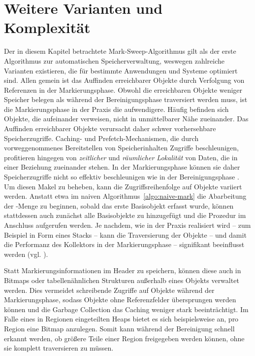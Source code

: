 

\section{Weitere Varianten und Komplexität}
\label{sec:mark-sweep-variations}
Der in diesem Kapitel betrachtete Mark-Sweep-Algorithmus gilt als der erste Algorithmus zur automatischen Speicherverwaltung, weswegen zahlreiche Varianten existieren, die für bestimmte Anwendungen und Systeme optimiert sind.
Allen gemein ist das Auffinden erreichbarer Objekte durch Verfolgung von Referenzen in der Markierungsphase.
Obwohl die erreichbaren Objekte weniger Speicher belegen als während der Bereinigungsphase traversiert werden muss, ist die Markierungsphase in der Praxis die aufwendigere.
Häufig befinden sich Objekte, die aufeinander verweisen, nicht in unmittelbarer Nähe zueinander.
Das Auffinden erreichbarer Objekte verursacht daher schwer vorhersehbare Speicherzugriffe.
Caching- und Prefetch-Mechanismen, die durch vorweggenommenes Bereitstellen von Speicherinhalten Zugriffe beschleunigen, profitieren hingegen von \textit{zeitlicher} und \textit{räumlicher Lokalität} von Daten, die in einer Beziehung zueinander stehen.
In der Markierungsphase können sie daher Speicherzugriffe nicht so effektiv beschleunigen wie in der Bereinigungsphase \cite[S. 21f]{handbook}.
Um diesen Makel zu beheben, kann die Zugriffsreihenfolge auf Objekte variiert werden.
Anstatt etwa im naiven Algorithmus~\ref{algo:naive-mark} die Abarbeitung der -Menge zu beginnen, sobald das erste Basisobjekt erfasst wurde, können stattdessen auch zunächst alle Basisobjekte zu  hinzugefügt und die Prozedur  im Anschluss aufgerufen werden.
Je nachdem, wie  in der Praxis realisiert wird -- zum Beispiel in Form eines Stacks -- kann die Traversierung der Objekte -- und damit die Performanz des Kollektors in der Markierungsphase -- signifikant beeinflusst werden (vgl. \cite[S. 19]{handbook}).

Statt Markierungsinformationen im Header zu speichern, können diese auch in Bitmaps oder tabellenähnlichen Strukturen außerhalb eines Objekts verwaltet werden.
Dies vermeidet schreibende Zugriffe auf Objekte während der Markierungsphase, sodass Objekte ohne Referenzfelder übersprungen werden können und die Garbage Collection das Caching weniger stark beeinträchtigt.
Im Falle eines in Regionen eingeteilten Heaps bietet es sich beispielsweise an, pro Region eine Bitmap anzulegen.
Somit kann während der Bereinigung schnell erkannt werden, ob größere Teile einer Region freigegeben werden können, ohne sie komplett traversieren zu müssen.

